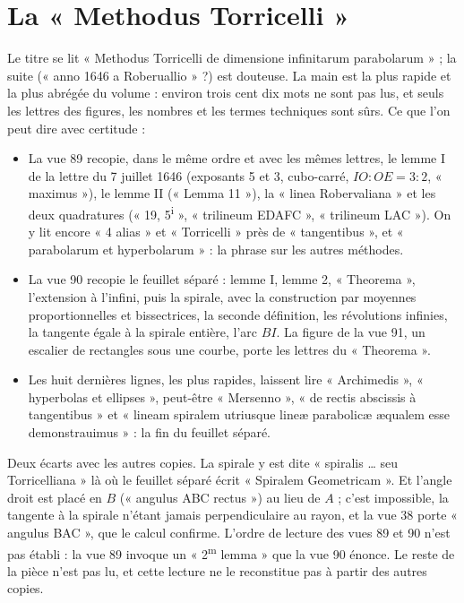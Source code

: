\documentclass[11pt,a4paper]{article}
\begin{document}
\section*{La « Methodus Torricelli »}

Le titre se lit « Methodus Torricelli de dimensione infinitarum parabolarum » ;
la suite (« anno 1646 a Roberuallio » ?) est douteuse. La main est la plus rapide
et la plus abrégée du volume : environ trois cent dix mots ne sont pas lus, et
seuls les lettres des figures, les nombres et les termes techniques sont sûrs.
Ce que l'on peut dire avec certitude :

\begin{itemize}
  \item La vue 89 recopie, dans le même ordre et avec les mêmes lettres, le
    lemme I de la lettre du 7 juillet 1646 (exposants 5 et 3, cubo-carré,
    $IO:OE = 3:2$, « maximus »), le lemme II (« Lemma 11 »), la « linea
    Robervaliana » et les deux quadratures (« 19, 5\textsuperscript{i} »,
    « trilineum EDAFC », « trilineum LAC »). On y lit encore « 4 alias » et
    « Torricelli » près de « tangentibus », et « parabolarum et hyperbolarum » :
    la phrase sur les autres méthodes.
  \item La vue 90 recopie le feuillet séparé : lemme I, lemme 2, « Theorema »,
    l'extension à l'infini, puis la spirale, avec la construction par moyennes
    proportionnelles et bissectrices, la seconde définition, les révolutions
    infinies, la tangente égale à la spirale entière, l'arc $BI$. La figure de la
    vue 91, un escalier de rectangles sous une courbe, porte les lettres du
    « Theorema ».
  \item Les huit dernières lignes, les plus rapides, laissent lire
    « Archimedis », « hyperbolas et ellipses », peut-être « Mersenno », « de rectis
    abscissis à tangentibus » et « lineam spiralem utriusque lineæ parabolicæ
    æqualem esse demonstrauimus » : la fin du feuillet séparé.
\end{itemize}

Deux écarts avec les autres copies. La spirale y est dite « spiralis \ldots{} seu
Torricelliana » là où le feuillet séparé écrit « Spiralem Geometricam ». Et
l'angle droit est placé en $B$ (« angulus ABC rectus ») au lieu de $A$ ; c'est
impossible, la tangente à la spirale n'étant jamais perpendiculaire au rayon, et
la vue 38 porte « angulus BAC », que le calcul confirme. L'ordre de lecture des
vues 89 et 90 n'est pas établi : la vue 89 invoque un « 2\textsuperscript{m}
lemma » que la vue 90 énonce. Le reste de la pièce n'est pas lu, et cette
lecture ne le reconstitue pas à partir des autres copies.
\end{document}
